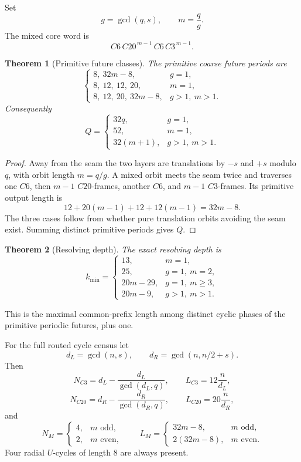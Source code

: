 \documentclass[11pt,a4paper]{article}
\newtheorem{theorem}{Theorem}
\theoremstyle{definition}
\begin{document}
Set
\[
\boxed{g=\gcd(q,s),\qquad m=\frac qg.}
\]
The mixed core word is
\[
\boxed{C6\,C20^{\,m-1}\,C6\,C3^{\,m-1}.}
\]

\begin{theorem}[Primitive future classes]\label{thm:future}
The primitive coarse future periods are
\[
\begin{cases}
8,\ 32m-8,&g=1,\\[1mm]
8,\ 12,\ 12,\ 20,&m=1,\\[1mm]
8,\ 12,\ 20,\ 32m-8,&g>1,\ m>1.
\end{cases}
\]
Consequently
\[
\boxed{
Q=
\begin{cases}
32q,&g=1,\\[1mm]
52,&m=1,\\[1mm]
32(m+1),&g>1,\ m>1.
\end{cases}}
\]
\end{theorem}

\begin{proof}
Away from the seam the two layers are translations by \(-s\) and \(+s\) modulo \(q\), with orbit length \(m=q/g\).
A mixed orbit meets the seam twice and traverses one \(C6\), then \(m-1\) \(C20\)-frames, another \(C6\), and \(m-1\) \(C3\)-frames.
Its primitive output length is
\[
12+20(m-1)+12+12(m-1)=32m-8.
\]
The three cases follow from whether pure translation orbits avoiding the seam exist.
Summing distinct primitive periods gives \(Q\).
\end{proof}

\begin{theorem}[Resolving depth]\label{thm:kmin}
The exact resolving depth is
\[
\boxed{
k_{\min}=
\begin{cases}
13,&m=1,\\
25,&g=1,\ m=2,\\
20m-29,&g=1,\ m\ge3,\\
20m-9,&g>1,\ m>1.
\end{cases}}
\]
\end{theorem}

This is the maximal common-prefix length among distinct cyclic phases of the primitive periodic futures, plus one.

For the full routed cycle census let
\[
d_L=\gcd(n,s),\qquad
d_R=\gcd(n,n/2+s).
\]
Then
\[
N_{C3}=d_L-\frac{d_L}{\gcd(d_L,q)},
\qquad
L_{C3}=12\frac n{d_L},
\]
\[
N_{C20}=d_R-\frac{d_R}{\gcd(d_R,q)},
\qquad
L_{C20}=20\frac n{d_R},
\]
and
\[
N_M=
\begin{cases}
4,&m\text{ odd},\\
2,&m\text{ even},
\end{cases}
\qquad
L_M=
\begin{cases}
32m-8,&m\text{ odd},\\
2(32m-8),&m\text{ even}.
\end{cases}
\]
Four radial \(U\)-cycles of length \(8\) are always present.
\end{document}
